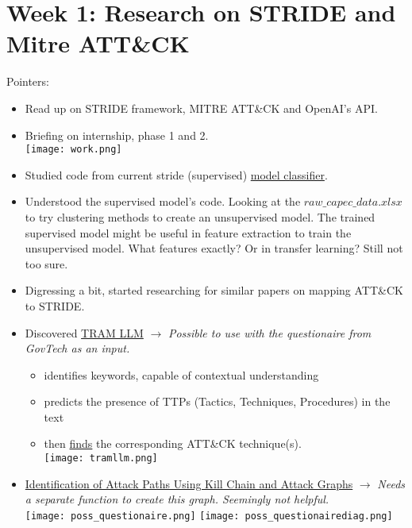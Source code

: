 \section*{Week 1: Research on STRIDE and Mitre ATT\&CK}
Pointers:
\begin{itemize}
    \item Read up on STRIDE framework, MITRE ATT\&CK and OpenAI's API.
    \item Briefing on internship, phase 1 and 2.\\
    \texttt{[image: work.png]}
    \item Studied code from current stride (supervised) \href{https://github.com/sebyakuya/stride-classifier/tree/master}{model classifier}.
    \item Understood the supervised model's code. Looking at the $raw\_capec\_data.xlsx$ to try clustering methods to create an unsupervised model. The trained supervised model might be useful in feature extraction to train the unsupervised model. What features exactly? Or in transfer learning? Still not too sure.
    \item Digressing a bit, started researching for similar papers on mapping ATT\&CK to STRIDE.
    \item Discovered \href{https://github.com/center-for-threat-informed-defense/tram}{TRAM LLM} $\rightarrow$ \textit{Possible to use with the questionaire from GovTech as an input.}
        \begin{itemize}
            \item identifies keywords, capable of contextual understanding
            \item predicts the presence of TTPs (Tactics, Techniques, Procedures) in the text
            \item then \href{https://github.com/center-for-threat-informed-defense/tram/wiki/Using-TRAM#machine-learning}{finds} the corresponding ATT\&CK technique(s).\\
            \texttt{[image: tramllm.png]}
        \end{itemize}
    \item \href{https://arxiv.org/pdf/2206.10272.pdf}{Identification of Attack Paths Using Kill Chain and Attack Graphs} $\rightarrow$ \textit{Needs a separate function to create this graph. Seemingly not helpful.}\\
    \texttt{[image: poss\_questionaire.png]}
    \texttt{[image: poss\_questionairediag.png]}

\end{itemize}
